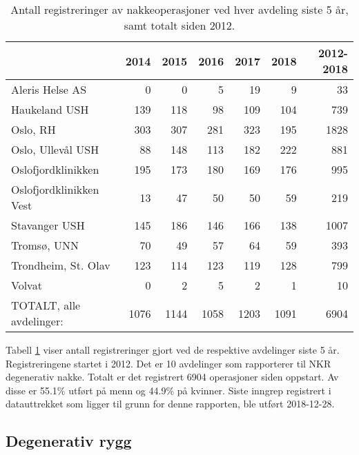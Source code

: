 \documentclass [norsk,a4paper,twoside]{article}\usepackage[]{graphicx}\usepackage[]{color}
\begin{document}
\begin{table}[ht]
\centering
\begin{tabular}{lrrrrrr}
  \hline
 & 2014 & 2015 & 2016 & 2017 & 2018 & 2012-2018 \\ 
  \hline
Aleris Helse AS & 0 & 0 & 5 & 19 & 9 & 33 \\ 
  Haukeland USH & 139 & 118 & 98 & 109 & 104 & 739 \\ 
  Oslo, RH & 303 & 307 & 281 & 323 & 195 & 1828 \\ 
  Oslo, Ullevål USH & 88 & 148 & 113 & 182 & 222 & 881 \\ 
  Oslofjordklinikken & 195 & 173 & 180 & 169 & 176 & 995 \\ 
  Oslofjordklinikken Vest & 13 & 47 & 50 & 50 & 59 & 219 \\ 
  Stavanger USH & 145 & 186 & 146 & 166 & 138 & 1007 \\ 
  Tromsø, UNN & 70 & 49 & 57 & 64 & 59 & 393 \\ 
  Trondheim, St. Olav & 123 & 114 & 123 & 119 & 128 & 799 \\ 
  Volvat & 0 & 2 & 5 & 2 & 1 & 10 \\ 
  TOTALT, alle avdelinger: & 1076 & 1144 & 1058 & 1203 & 1091 & 6904 \\ 
   \hline
\end{tabular}
\caption{Antall registreringer av nakkeoperasjoner ved hver avdeling siste 5 år, samt totalt siden 2012.} 
\label{tab:AntRegNakke}
\end{table}



Tabell \ref{tab:AntRegNakke} viser antall 
registreringer gjort ved de respektive avdelinger siste 5 år. Registreringene startet i 2012. 
Det er  
10 avdelinger som rapporterer til NKR degenerativ nakke. 
Totalt er det registrert 6904 operasjoner siden oppstart. Av disse er 55.1\% utført på menn og 44.9\% på kvinner.
Siste inngrep registrert i datauttrekket som ligger til grunn for denne rapporten, ble utført 
2018-12-28. 
\par




\subsection{Degenerativ rygg}
\end{document}
